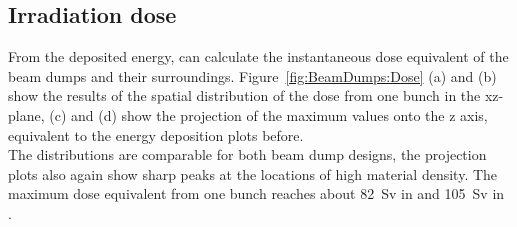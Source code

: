 \subsection{Irradiation dose}
\label{BeamDumps:sim_surrounding:Dose} 
From the deposited energy, \fluka can calculate the instantaneous dose equivalent of the beam dumps and their surroundings.
Figure~\ref{fig:BeamDumps:Dose} (a) and (b) show the \fluka results of the spatial distribution of the dose from one bunch in the xz-plane, (c) and (d) show the projection of the maximum values onto the z axis, equivalent to the energy deposition plots before.
\\The distributions are comparable for both beam dump designs, the projection plots also again show sharp peaks at the locations of high material density.
The maximum dose equivalent from one bunch reaches about \SI{82}{\sievert} in \designone and \SI{105}{\sievert} in \designtwo.
